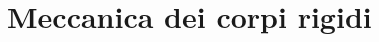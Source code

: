 \documentclass[11pt,a4paper]{book}
\begin{document}
\part{Meccanica dei corpi rigidi}
%
%
%


%

\end{document}
